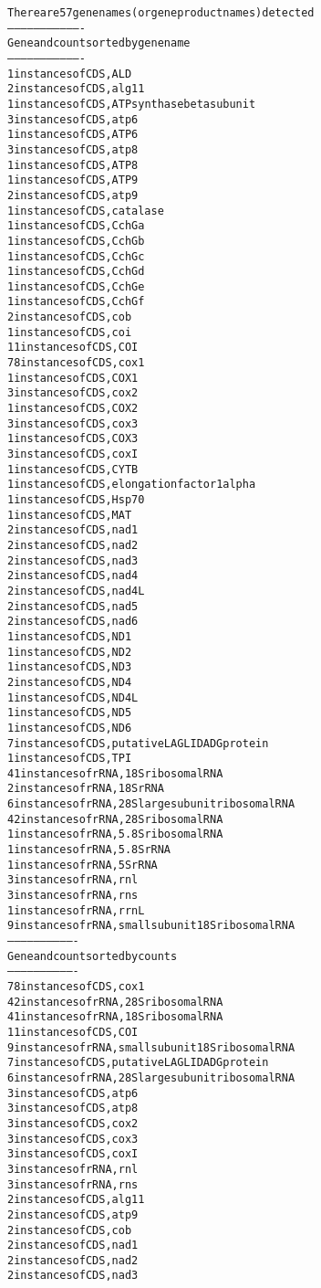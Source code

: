 \documentclass[letterpaper,10pt,english]{/usr/share/sphinx/texinputs/sphinxhowto}
\newenvironment{InvisibleVerbatim}
        {\begin{mdframed}[leftmargin=0.1\linewidth,innerleftmargin=3pt,innerrightmargin=3pt, userdefinedwidth=1\linewidth, linewidth=0pt, linecolor=white, usetwoside=false]}
        {\end{mdframed}}
\begin{document}
                \begin{InvisibleVerbatim}
                \vspace{-0.5\baselineskip}
\begin{alltt}
There are 57 gene names (or gene product names) detected
----------------------------------
Gene and count sorted by gene name
----------------------------------
1 instances of CDS,ALD
2 instances of CDS,alg11
1 instances of CDS,ATP synthase beta subunit
3 instances of CDS,atp6
1 instances of CDS,ATP6
3 instances of CDS,atp8
1 instances of CDS,ATP8
1 instances of CDS,ATP9
2 instances of CDS,atp9
1 instances of CDS,catalase
1 instances of CDS,CchGa
1 instances of CDS,CchGb
1 instances of CDS,CchGc
1 instances of CDS,CchGd
1 instances of CDS,CchGe
1 instances of CDS,CchGf
2 instances of CDS,cob
1 instances of CDS,coi
11 instances of CDS,COI
78 instances of CDS,cox1
1 instances of CDS,COX1
3 instances of CDS,cox2
1 instances of CDS,COX2
3 instances of CDS,cox3
1 instances of CDS,COX3
3 instances of CDS,coxI
1 instances of CDS,CYTB
1 instances of CDS,elongation factor 1 alpha
1 instances of CDS,Hsp70
1 instances of CDS,MAT
2 instances of CDS,nad1
2 instances of CDS,nad2
2 instances of CDS,nad3
2 instances of CDS,nad4
2 instances of CDS,nad4L
2 instances of CDS,nad5
2 instances of CDS,nad6
1 instances of CDS,ND1
1 instances of CDS,ND2
1 instances of CDS,ND3
2 instances of CDS,ND4
1 instances of CDS,ND4L
1 instances of CDS,ND5
1 instances of CDS,ND6
7 instances of CDS,putative LAGLIDADG protein
1 instances of CDS,TPI
41 instances of rRNA,18S ribosomal RNA
2 instances of rRNA,18S rRNA
6 instances of rRNA,28S large subunit ribosomal RNA
42 instances of rRNA,28S ribosomal RNA
1 instances of rRNA,5.8S ribosomal RNA
1 instances of rRNA,5.8S rRNA
1 instances of rRNA,5S rRNA
3 instances of rRNA,rnl
3 instances of rRNA,rns
1 instances of rRNA,rrnL
9 instances of rRNA,small subunit 18S ribosomal RNA
-------------------------------
Gene and count sorted by counts
-------------------------------
78 instances of CDS,cox1
42 instances of rRNA,28S ribosomal RNA
41 instances of rRNA,18S ribosomal RNA
11 instances of CDS,COI
9 instances of rRNA,small subunit 18S ribosomal RNA
7 instances of CDS,putative LAGLIDADG protein
6 instances of rRNA,28S large subunit ribosomal RNA
3 instances of CDS,atp6
3 instances of CDS,atp8
3 instances of CDS,cox2
3 instances of CDS,cox3
3 instances of CDS,coxI
3 instances of rRNA,rnl
3 instances of rRNA,rns
2 instances of CDS,alg11
2 instances of CDS,atp9
2 instances of CDS,cob
2 instances of CDS,nad1
2 instances of CDS,nad2
2 instances of CDS,nad3

\end{alltt}
\end{InvisibleVerbatim}
\end{document}
